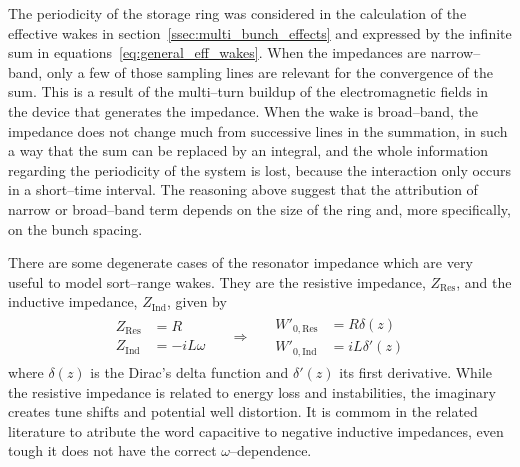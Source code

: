     The periodicity of the storage ring was considered in the calculation of the effective wakes in section~\ref{ssec:multi_bunch_effects} and expressed by the infinite sum in equations~\eqref{eq:general_eff_wakes}. When the impedances are narrow--band, only a few of those sampling lines are relevant for the convergence of the sum. This is a result of the multi--turn buildup of the electromagnetic fields in the device that generates the impedance. When the wake is broad--band, the impedance does not change much from successive lines in the summation, in such a way that the sum can be replaced by an integral, and the whole information regarding the periodicity of the system is lost, because the interaction only occurs in a short--time interval. The reasoning above suggest that the attribution of narrow or broad--band term depends on the size of the ring and, more specifically, on the bunch spacing.

    There are some degenerate cases of the resonator impedance which are very useful to model sort--range wakes. They are the resistive impedance, $Z_\text{Res}$, and the inductive impedance, $Z_\text{Ind}$, given by
    \begin{align}
        \begin{aligned}
            Z_\text{Res} &= R \\
            Z_\text{Ind} &= -iL\omega
        \end{aligned}
        && \Rightarrow &&
        \begin{aligned}
            W'_{0,\text{Res}} &= R\delta(z) \\
            W'_{0,\text{Ind}} &= iL\delta'(z)
        \end{aligned}
    \end{align}
    where $\delta(z)$ is the Dirac's delta function and $\delta'(z)$ its first derivative. While the resistive impedance is related to energy loss and instabilities, the imaginary creates tune shifts and potential well distortion. It is commom in the related literature to atribute the word capacitive to negative inductive impedances, even tough it does not have the correct $\omega$--dependence.

